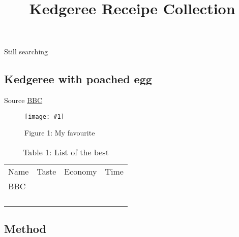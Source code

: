 \documentclass{article}
\newlength{\imgwidth}
\newcommand\scaledgraphics[2]{%
                
\settowidth{\imgwidth}{\texttt{[image: \#1]}}%
                
\setlength{\imgwidth}{\minof{\imgwidth}{#2\textwidth}}%
                
\texttt{[image: \#1]}%
                
}
\begin{document}
\title{Kedgeree Receipe Collection}

\maketitle


Still searching


\subsection{Kedgeree with poached egg}\label{H8853466}



Source \href{https://www.bbcgoodfood.com/recipes/kedgeree}{BBC}

\begin{figure}
\scaledgraphics{ea892ad3-f5cd-4942-879b-a7fb578387cd.jpg}{1}
\caption*{Figure 1: My favourite}\label{F56905941}
\end{figure}

\begin{table}
\caption*{Table 1: List of the best}\label{T56635471}

\begin{tabu} to \textwidth { |X|X|X|X| }
\hline



Name & Taste & Economy & Time
 \\


BBC &  &  & 
 \\


 &  &  & 
 \\


 &  &  & 
 \\


 &  &  & 
 \\


 &  &  & 
 \\
\hline

\end{tabu}\end{table}


\subsection{Method}\label{H1167238}
\end{document}
